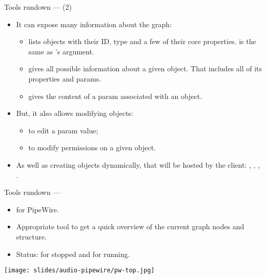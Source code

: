 \begin{frame}{Tools rundown —  (2)}
  \begin{itemize}

  \item It can expose many information about the graph:

    \begin{itemize}

    \item {} lists objects with their ID,
      type and a few of their core properties.  is the
      same as 's argument.

    \item {} gives all possible
      information about a given object. That includes all of its
      properties and params.

    \item {} gives the
      content of a param associated with an object.

    \end{itemize}

  \item But, it also allows modifying objects:

    \begin{itemize}
    \item {} to
      edit a param value;
    \item {}
      to modify permissions on a given object.
    \end{itemize}

  \item As well as creating objects dynamically, that will be hosted by
    the  client: , ,
    , .

  \end{itemize}
\end{frame}



\begin{frame}{Tools rundown — }
  \begin{itemize}

  \item {} for PipeWire.

  \item Appropriate tool to get a quick overview of the current graph
    nodes and structure.

  \item Status:  for stopped and  for running.

  \end{itemize}

  \begin{center}
    \texttt{[image: slides/audio-pipewire/pw-top.jpg]}\\
  \end{center}
\end{frame}



